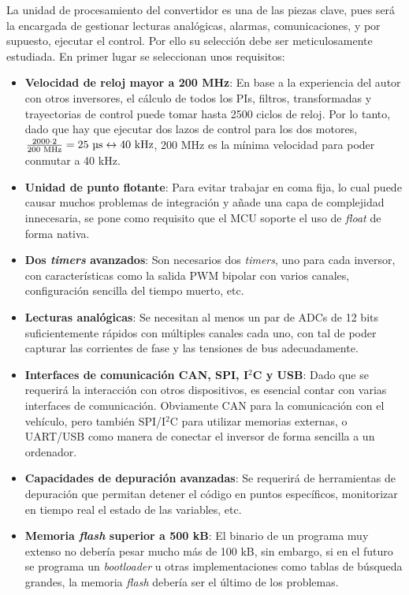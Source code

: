 La unidad de procesamiento del convertidor es una de las piezas clave, pues será la encargada de gestionar lecturas analógicas, alarmas, comunicaciones, y por supuesto, ejecutar el control. Por ello su selección debe ser meticulosamente estudiada. En primer lugar se seleccionan unos requisitos:

\begin{itemize}
	\item \textbf{Velocidad de reloj mayor a 200 MHz}: En base a la experiencia del autor con otros inversores, el cálculo de todos los PIs, filtros, transformadas y trayectorias de control puede tomar hasta 2500 ciclos de reloj. Por lo tanto, dado que hay que ejecutar dos lazos de control para los dos motores, $\frac{2000 \cdot 2}{200 \text{ MHz}} = 25 \text{ }\text{\unit{\micro\second}} \leftrightarrow 40 \text{ kHz}$, 200 MHz es la mínima velocidad para poder conmutar a 40 kHz.
	\item \textbf{Unidad de punto flotante}: Para evitar trabajar en coma fija, lo cual puede causar muchos problemas de integración y añade una capa de complejidad innecesaria, se pone como requisito que el MCU soporte el uso de \textit{float} de forma nativa.
	\item \textbf{Dos \textit{timers} avanzados}: Son necesarios dos \textit{timers}, uno para cada inversor, con características como la salida PWM bipolar con varios canales, configuración sencilla del tiempo muerto, etc.
	\item \textbf{Lecturas analógicas}: Se necesitan al menos un par de ADCs de 12 bits suficientemente rápidos con múltiples canales cada uno, con tal de poder capturar las corrientes de fase y las tensiones de bus adecuadamente.
	\item \textbf{Interfaces de comunicación CAN, SPI, I$^2$C y USB}: Dado que se requerirá la interacción con otros dispositivos, es esencial contar con varias interfaces de comunicación. Obviamente CAN para la comunicación con el vehículo, pero también SPI/I$^2$C para utilizar memorias externas, o UART/USB como manera de conectar el inversor de forma sencilla a un ordenador.
	\item \textbf{Capacidades de depuración avanzadas}: Se requerirá de herramientas de depuración que permitan detener el código en puntos específicos, monitorizar en tiempo real el estado de las variables, etc.
	\item \textbf{Memoria \textit{flash} superior a 500 kB}: El binario de un programa muy extenso no debería pesar mucho más de 100 kB, sin embargo, si en el futuro se programa un \textit{bootloader} u otras implementaciones como tablas de búsqueda grandes, la memoria \textit{flash} debería ser el último de los problemas.
	
\end{itemize}

